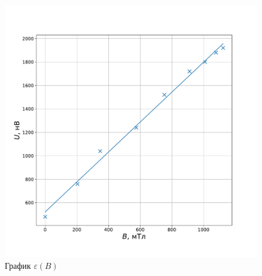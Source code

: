\documentclass[a4paper, 12pt]{article}
\newcommand{\eps}{\varepsilon}
\begin{document}
\begin{figure}[!h]
    \includegraphics[scale = 0.35]{Zinc}
    \centering
    \caption{График $\eps (B)$}
\end{figure}
\end{document}
